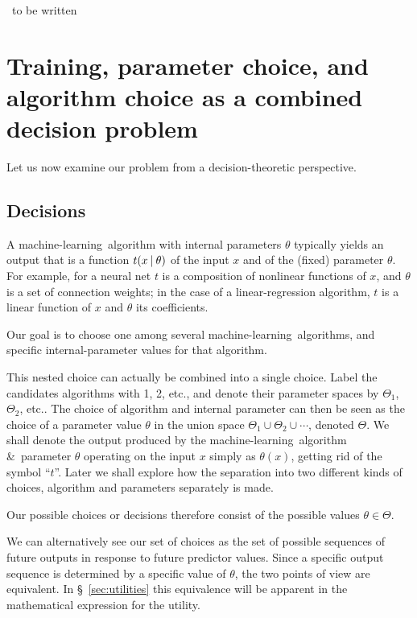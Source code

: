 \documentclass[\ifafour a4paper,12pt,\else a5paper,10pt,\fi%
onecolumn,oneside,article,%
british%
]{memoir}
\theoremstyle{remark}
\theoremstyle{innote}
\newcommand*{\amp}{\&}
\renewcommand*{\|}[1][]{\nonscript\:#1\vert\nonscript\:\mathopen{}}
\renewcommand*{\=}{\TextOrMath\texteq\eq}
\newcommand*{\sect}{\S}%
\newcommand*{\etc}{{etc.}}
\newcommand*{\wrench}{{\fontencoding{U}\fontfamily{fontawesomethree}\selectfont\symbol{114}}}
\newcommand{\mynote}[1]{ {\color{notecolour}#1}}
\newcommand*{\ml}{machine-learning}
\begin{document}
\mynote{\wrench\ to be written}

\section{Training, parameter choice, and algorithm choice as a combined
  decision problem}
\label{sec:training_as_decision}

Let us now examine our problem from a decision-theoretic perspective.

\subsection{Decisions}
\label{sec:decisions}

A \ml\ algorithm with internal parameters $\theta$ typically yields an
output that is a function $t(x \| \theta)$ of the input $x$ and of the
(fixed) parameter $\theta$. For example, for a neural net $t$ is a
composition of nonlinear functions of $x$, and $\theta$ is a set of
connection weights; in the case of a linear-regression algorithm, $t$ is a
linear function of $x$ and $\theta$ its coefficients.

Our goal is to choose one among several \ml\ algorithms, and specific
internal-parameter values for that algorithm.

This nested choice can actually be combined into a single choice. Label the
candidates algorithms with 1, 2, \etc, and denote their parameter spaces by
$\varTheta_{1}$, $\varTheta_{2}$, \etc. The choice of algorithm and
internal parameter can then be seen as the choice of a parameter value
$\theta$ in the union space $\varTheta_{1} \cup \varTheta_{2} \cup\dotsb$,
denoted $\varTheta$. We shall denote the output produced by the \ml\
algorithm \amp\ parameter $\theta$ operating on the input $x$ simply as
$\theta(x)$, getting rid of the symbol \enquote{$t$}. Later we shall
explore how the separation into two different kinds of choices, algorithm
and parameters separately is made.

Our possible choices or decisions therefore consist of the possible values
$\theta \in \varTheta$.

We can alternatively see our set of choices as the set of possible
sequences of future outputs in response to future predictor values.
Since a specific output sequence is determined by a specific value of
$\theta$, the two points of view are equivalent. In
\sect~\ref{sec:utilities} this equivalence will be apparent in the
mathematical expression for the utility.
\end{document}
